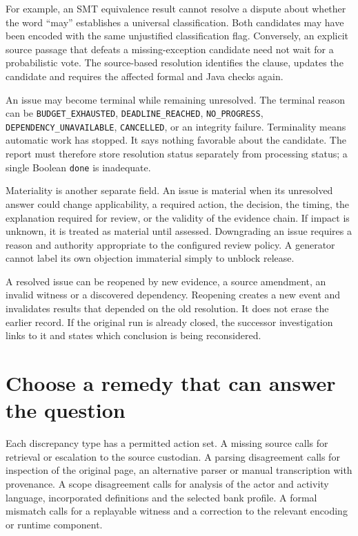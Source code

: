 \documentclass[12pt,a4paper,oneside,openany]{book}
\begin{document}
For example, an SMT equivalence result cannot resolve a dispute about whether the
word ``may'' establishes a universal classification. Both candidates may have
been encoded with the same unjustified classification flag. Conversely, an
explicit source passage that defeats a missing-exception candidate need not wait
for a probabilistic vote. The source-based resolution identifies the clause,
updates the candidate and requires the affected formal and Java checks again.

An issue may become terminal while remaining unresolved. The terminal reason can
be \texttt{BUDGET\_EXHAUSTED}, \texttt{DEADLINE\_REACHED}, \texttt{NO\_PROGRESS},
\texttt{DEPENDENCY\_UNAVAILABLE}, \texttt{CANCELLED}, or an integrity failure.
Terminality means automatic work has stopped. It says nothing favorable about
the candidate. The report must therefore store resolution status separately from
processing status; a single Boolean \texttt{done} is inadequate.

Materiality is another separate field. An issue is material when its unresolved
answer could change applicability, a required action, the decision, the timing,
the explanation required for review, or the validity of the evidence chain. If
impact is unknown, it is treated as material until assessed. Downgrading an issue
requires a reason and authority appropriate to the configured review policy.
A generator cannot label its own objection immaterial simply to unblock release.

A resolved issue can be reopened by new evidence, a source amendment, an invalid
witness or a discovered dependency. Reopening creates a new event and invalidates
results that depended on the old resolution. It does not erase the earlier
record. If the original run is already closed, the successor investigation links
to it and states which conclusion is being reconsidered.

\section{Choose a remedy that can answer the question}

Each discrepancy type has a permitted action set. A missing source calls for
retrieval or escalation to the source custodian. A parsing disagreement calls for
inspection of the original page, an alternative parser or manual transcription
with provenance. A scope disagreement calls for analysis of the actor and
activity language, incorporated definitions and the selected bank profile. A
formal mismatch calls for a replayable witness and a correction to the relevant
encoding or runtime component.
\end{document}
